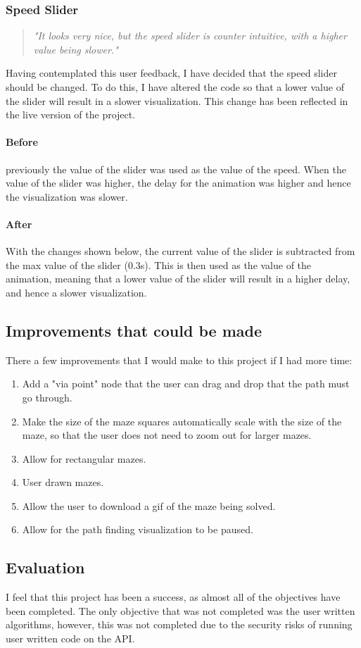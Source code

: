 \documentclass[titlepage]{article}
\begin{document}
\subsubsection{Speed Slider}
\begin{quote}
    \textit{
        "It looks very nice, but the speed slider is counter intuitive, with a higher value being slower."
    }
\end{quote}
Having contemplated this user feedback, I have decided that the speed slider should be changed. To do this, I have altered the code so that a lower value of the slider will result in a slower visualization. This change has been reflected in the live version of the project.
\paragraph*{Before}
previously the value of the slider was used as the value of the speed. When the value of the slider was higher, the delay for the animation was higher and hence the visualization was slower.

\paragraph*{After}
With the changes shown below, the current value of the slider is subtracted from the max value of the slider (0.3s). This is then used as the value of the animation, meaning that a lower value of the slider will result in a higher delay, and hence a slower visualization.


\subsection{Improvements that could be made}
There a few improvements that I would make to this project if I had more time:
\begin{enumerate}
    \item Add a "via point" node that the user can drag and drop that the path must go through.
    \item Make the size of the maze squares automatically scale with the size of the maze, so that the user does not need to zoom out for larger mazes.
    \item Allow for rectangular mazes.
    \item User drawn mazes.
    \item Allow the user to download a gif of the maze being solved.
    \item Allow for the path finding visualization to be paused.
\end{enumerate}

\subsection{Evaluation}
I feel that this project has been a success, as almost all of the objectives have been completed. The only objective that was not completed was the user written algorithms, however, this was not completed due to the security risks of running user written code on the API.
\end{document}
